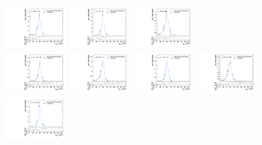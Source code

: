 \begin{figure}[htpb]
  \includegraphics[width=0.2\textwidth]{fig/2Dfit/templateVsReco_VBFRadToWW2000_r0_MJ_mu_LP_bb_LDy.pdf}
  \includegraphics[width=0.2\textwidth]{fig/2Dfit/templateVsReco_VBFRadToWW2000_r0_MJ_mu_HP_bb_HDy.pdf}
  \includegraphics[width=0.2\textwidth]{fig/2Dfit/templateVsReco_VBFRadToWW2000_r0_MJ_mu_LP_bb_HDy.pdf}\\
  \includegraphics[width=0.2\textwidth]{fig/2Dfit/templateVsReco_VBFRadToWW2000_r0_MJ_mu_HP_nobb_LDy.pdf}
  \includegraphics[width=0.2\textwidth]{fig/2Dfit/templateVsReco_VBFRadToWW2000_r0_MJ_mu_LP_nobb_LDy.pdf}
  \includegraphics[width=0.2\textwidth]{fig/2Dfit/templateVsReco_VBFRadToWW2000_r0_MJ_mu_HP_nobb_HDy.pdf}
  \includegraphics[width=0.2\textwidth]{fig/2Dfit/templateVsReco_VBFRadToWW2000_r0_MJ_mu_LP_nobb_HDy.pdf}\\
  \includegraphics[width=0.2\textwidth]{fig/2Dfit/templateVsReco_VBFRadToWW2000_r0_MJ_mu_HP_vbf_LDy.pdf}

\end{figure}
